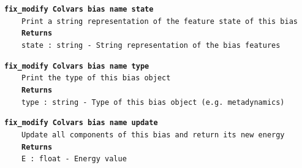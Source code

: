 \begin{mdexampleinput}{}
\texttt{\textbf{fix\_modify Colvars bias name state}}
\\
\-~~~~\texttt{Print a string representation of the feature state of this bias}
\\
\-~~~~\texttt{\textbf{Returns}}
\\
\-~~~~\texttt{state : string - String representation of the bias features}
\end{mdexampleinput}
\begin{mdexampleinput}{}
\texttt{\textbf{fix\_modify Colvars bias name type}}
\\
\-~~~~\texttt{Print the type of this bias object}
\\
\-~~~~\texttt{\textbf{Returns}}
\\
\-~~~~\texttt{type : string - Type of this bias object (e.g. metadynamics)}
\end{mdexampleinput}
\begin{mdexampleinput}{}
\texttt{\textbf{fix\_modify Colvars bias name update}}
\\
\-~~~~\texttt{Update all components of this bias and return its new energy}
\\
\-~~~~\texttt{\textbf{Returns}}
\\
\-~~~~\texttt{E : float - Energy value}
\end{mdexampleinput}
